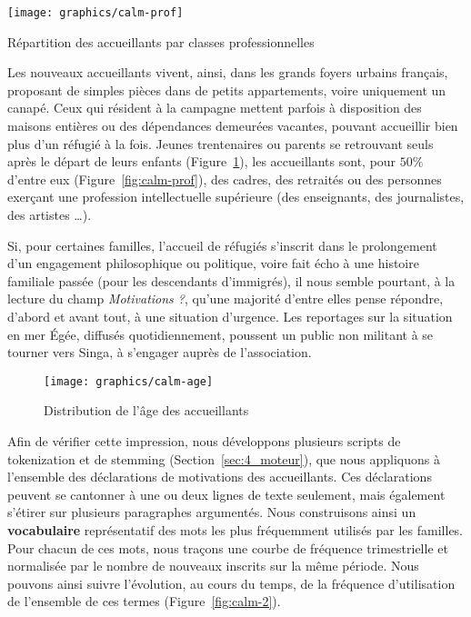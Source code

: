 \documentclass[symmetric,justified,marginals=raggedouter]{tufte-book}
\begin{document}
\begin{marginfigure}%
  \texttt{[image: graphics/calm-prof]}
  \vspace*{0.2cm}  
  \caption{Répartition des accueillants par classes professionnelles}
  \label{fig:calm-prof}
\end{marginfigure} 

Les nouveaux accueillants vivent, ainsi, dans les grands foyers urbains français, proposant de simples pièces dans de petits appartements, voire uniquement un canapé. Ceux qui résident à la campagne mettent parfois à disposition des maisons entières ou des dépendances demeurées vacantes, pouvant accueillir bien plus d'un réfugié à la fois. Jeunes trentenaires ou parents se retrouvant seuls après le départ de leurs enfants (Figure~\ref{fig:calm-age}), les accueillants sont, pour $50\%$ d'entre eux (Figure~\ref{fig:calm-prof}), des cadres, des retraités ou des personnes exerçant une profession intellectuelle supérieure (des enseignants, des journalistes, des artistes …).

Si, pour certaines familles, l'accueil de réfugiés s'inscrit dans le prolongement d'un engagement philosophique ou politique, voire fait écho à une histoire familiale passée (pour les descendants d'immigrés), il nous semble pourtant, à la lecture du champ \textit{Motivations ?}, qu'une majorité d'entre elles pense répondre, d'abord et avant tout, à une situation d'urgence. Les reportages sur la situation en mer Égée, diffusés quotidiennement, poussent un public non militant à se tourner vers Singa, à s'engager auprès de l'association. 

\begin{figure}
  \texttt{[image: graphics/calm-age]}
  \caption{Distribution de l'âge des accueillants}
  \label{fig:calm-age}
\end{figure} 

\noindent Afin de vérifier cette impression, nous développons plusieurs scripts de tokenization et de stemming (Section~\ref{sec:4_moteur}), que nous appliquons à l'ensemble des déclarations de motivations des accueillants. Ces déclarations peuvent se cantonner à une ou deux lignes de texte seulement, mais également s'étirer sur plusieurs paragraphes argumentés. Nous construisons ainsi un \textbf{vocabulaire} représentatif des mots les plus fréquemment utilisés par les familles. Pour chacun de ces mots, nous traçons une courbe de fréquence trimestrielle et normalisée par le nombre de nouveaux inscrits sur la même période. Nous pouvons ainsi suivre l'évolution, au cours du temps, de la fréquence d'utilisation de l'ensemble de ces termes (Figure~\ref{fig:calm-2}).
\end{document}
